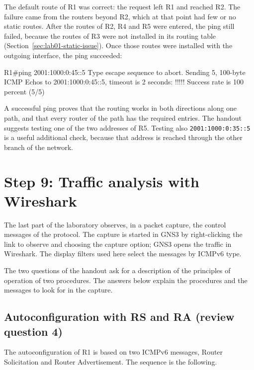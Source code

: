 The default route of R1 was correct: the request left R1 and reached R2. The failure came from the routers beyond R2, which at that point had few or no static routes. After the routes of R2, R4 and R5 were entered, the ping still failed, because the routes of R3 were not installed in its routing table (Section~\ref{sec:lab01-static-issue}). Once those routes were installed with the outgoing interface, the ping succeeded:

\begin{codeblock}
R1#ping 2001:1000:0:45::5
Type escape sequence to abort.
Sending 5, 100-byte ICMP Echos to 2001:1000:0:45::5, timeout is 2 seconds:
!!!!!
Success rate is 100 percent (5/5)
\end{codeblock}

A successful ping proves that the routing works in both directions along one path, and that every router of the path has the required entries. The handout suggests testing one of the two addresses of R5. Testing also \texttt{2001:1000:0:35::5} is a useful additional check, because that address is reached through the other branch of the network.

\section{Step 9: Traffic analysis with Wireshark}

The last part of the laboratory observes, in a packet capture, the control messages of the protocol. The capture is started in GNS3 by right-clicking the link to observe and choosing the capture option; GNS3 opens the traffic in Wireshark. The display filters used here select the messages by ICMPv6 type.

The two questions of the handout ask for a description of the principles of operation of two procedures. The answers below explain the procedures and the messages to look for in the capture.

\subsection{Autoconfiguration with RS and RA (review question 4)}
\label{sec:lab01-rs-ra}

The autoconfiguration of R1 is based on two ICMPv6 messages, Router Solicitation and Router Advertisement. The sequence is the following.

